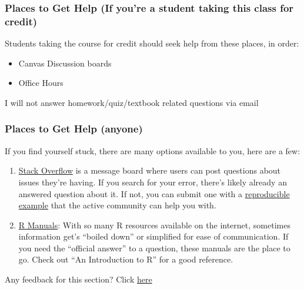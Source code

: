 \documentclass[
]{article}
\providecommand{\tightlist}{%
  \setlength{\itemsep}{0pt}\setlength{\parskip}{0pt}}
\newenvironment{feedback}{
  \specialblock{feedback}{chat-1-fill.png}{Feedback}
}{\endspecialblock}
\begin{document}
\hypertarget{places-to-get-help-if-youre-a-student-taking-this-class-for-credit}{%
\subsubsection{Places to Get Help (If you're a student taking this class for credit)}\label{places-to-get-help-if-youre-a-student-taking-this-class-for-credit}}

Students taking the course for credit should seek help from these places, in order:

\begin{itemize}
\tightlist
\item
  Canvas Discussion boards
\item
  Office Hours
\end{itemize}

I will not answer homework/quiz/textbook related questions via email

\hypertarget{places-to-get-help-anyone}{%
\subsubsection{Places to Get Help (anyone)}\label{places-to-get-help-anyone}}

If you find yourself stuck, there are many options available to you, here are a few:

\begin{enumerate}
\def\labelenumi{\arabic{enumi}.}
\tightlist
\item
  \href{https://stackoverflow.com}{Stack Overflow} is a message board where users can post questions about issues they're having. If you search for your error, there's likely already an answered question about it. If not, you can submit one with a \href{https://stackoverflow.com/questions/5963269/how-to-make-a-great-r-reproducible-example}{reproducible example} that the active community can help you with.
\item
  \href{https://cran.r-project.org/manuals.html}{R Manuals}: With so many R resources available on the internet, sometimes information get's ``boiled down'' or simplified for ease of communication. If you need the ``official answer'' to a question, these manuals are the place to go. Check out ``An Introduction to R'' for a good reference.
\end{enumerate}

\begin{feedback}
Any feedback for this section? Click
\href{https://docs.google.com/forms/d/e/1FAIpQLSePQZ3lIaCIPo9J2owXImHZ_9wBEgTo21A0s-A1ty28u4yfvw/viewform?entry.1684471501=The\%20R\%20Community}{here}
\end{feedback}

  
\end{document}
